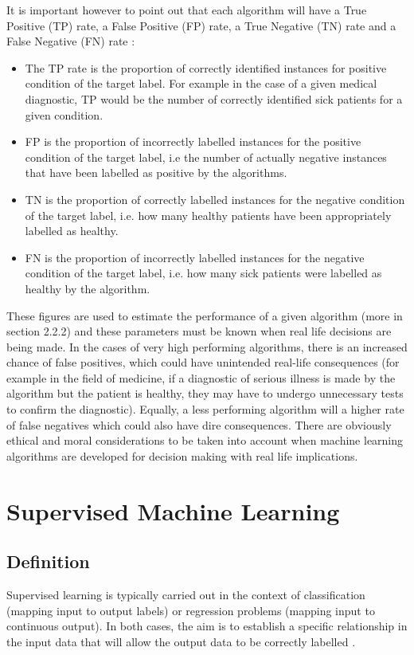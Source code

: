 It is important however to point out that each algorithm will have a True Positive (TP) rate, a False Positive (FP) rate, a True Negative (TN) rate and a False Negative (FN) rate \citep{Ting:2016ue}:
\begin{itemize}
    \item The TP rate is the proportion of correctly identified instances for positive condition of the target label. For example in the case of a given medical diagnostic, TP would be the number of correctly identified sick patients for a given condition.
    \item  FP is the proportion of incorrectly labelled instances for the positive condition of the target label, i.e the number of actually negative instances that have been labelled as positive by the algorithms. 
    \item TN is the proportion of correctly labelled instances for the negative condition of the target label, i.e. how many healthy patients have been appropriately labelled as healthy.
    \item FN is the proportion of incorrectly labelled instances for the negative condition of the target label, i.e. how many sick patients were labelled as healthy by the algorithm.
\end{itemize}

These figures are used to estimate the performance of a given algorithm (more in section 2.2.2) and these parameters must be known when real life decisions are being made. In the cases of very high performing algorithms, there is an increased chance of false positives, which could have unintended real-life consequences (for example in the field of medicine, if a diagnostic of serious illness is made by the algorithm but the patient is healthy, they may have to undergo unnecessary tests to confirm the diagnostic). Equally, a less performing algorithm will a higher rate of false negatives which could also have dire consequences. There are obviously ethical and moral considerations to be taken into account when machine learning algorithms are developed for decision making with real life implications. 

\section{Supervised Machine Learning}
\subsection{Definition}
Supervised learning is typically carried out in the context of classification (mapping input to output labels) or regression problems (mapping input to continuous output). In both cases, the aim is to establish a specific relationship in the input data that will allow the output data to be correctly labelled \citep{Soni:tr}. 

